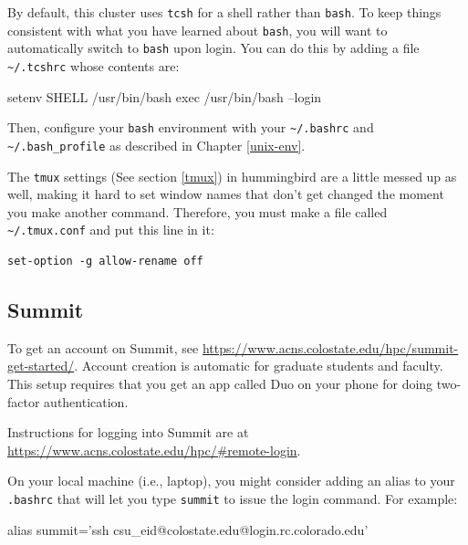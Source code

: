 \documentclass[]{krantz}
\makeatletter
\newenvironment{Shaded}{\begin{snugshade}}{\end{snugshade}}
\newcommand{\BuiltInTok}[1]{#1}
\newcommand{\ExtensionTok}[1]{#1}
\newcommand{\NormalTok}[1]{#1}
\newcommand{\StringTok}[1]{\textcolor[rgb]{0.5,0.5,0.5}{#1}}
\newenvironment{kframe}{%
\medskip{}
\setlength{\fboxsep}{.8em}
 \def\at@end@of@kframe{}%
 \ifinner\ifhmode%
  \def\at@end@of@kframe{\end{minipage}}%
  \begin{minipage}{\columnwidth}%
 \fi\fi%
 \def\FrameCommand##1{\hskip\@totalleftmargin \hskip-\fboxsep
 \colorbox{shadecolor}{##1}\hskip-\fboxsep
     \hskip-\linewidth \hskip-\@totalleftmargin \hskip\columnwidth}%
 \MakeFramed {\advance\hsize-\width
   \@totalleftmargin\z@ \linewidth\hsize
   \@setminipage}}%
 {\par\unskip\endMakeFramed%
 \at@end@of@kframe}
\renewenvironment{Shaded}{\begin{kframe}}{\end{kframe}}
\makeatother
\begin{document}
By default, this cluster uses \texttt{tcsh} for a shell rather than \texttt{bash}. To keep things
consistent with what you have learned about \texttt{bash}, you will want to automatically switch
to \texttt{bash} upon login. You can do this by adding a file \texttt{\textasciitilde{}/.tcshrc} whose contents are:

\begin{Shaded}
\begin{Highlighting}[]
\ExtensionTok{setenv}\NormalTok{ SHELL /usr/bin/bash}
\BuiltInTok{exec}\NormalTok{ /usr/bin/bash --login}
\end{Highlighting}
\end{Shaded}

Then, configure your \texttt{bash} environment with your \texttt{\textasciitilde{}/.bashrc} and \texttt{\textasciitilde{}/.bash\_profile} as
described in Chapter \ref{unix-env}.

The \texttt{tmux} settings (See section \ref{tmux}) in hummingbird are a little messed up as well, making
it hard to set window names that don't get changed the moment you make another command. Therefore,
you must make a file called \texttt{\textasciitilde{}/.tmux.conf} and put this line in it:

\begin{verbatim}
set-option -g allow-rename off
\end{verbatim}

\hypertarget{summit}{%
\subsection{Summit}\label{summit}}

To get an account on Summit, see \url{https://www.acns.colostate.edu/hpc/summit-get-started/}. Account creation is automatic for graduate students and faculty. This setup requires
that you get an app called Duo on your phone for doing two-factor authentication.

Instructions for logging into Summit are at \url{https://www.acns.colostate.edu/hpc/\#remote-login}.

On your local machine (i.e., laptop), you might consider adding an alias to your
\texttt{.bashrc} that will let you type \texttt{summit} to issue the login command. For example:

\begin{Shaded}
\begin{Highlighting}[]
\BuiltInTok{alias}\NormalTok{ summit=}\StringTok{'ssh csu_eid@colostate.edu@login.rc.colorado.edu'}
\end{Highlighting}
\end{Shaded}
\end{document}
